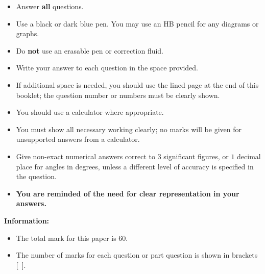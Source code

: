 \documentclass[11pt]{article}
\begin{document}
{\large
	
	\begin{itemize}
		
		\item Answer {\bf all} questions.
		
		\item Use a black or dark blue pen. You may use an HB pencil for
		any diagrams or graphs.
		
		\item Do {\bf not} use an erasable pen or correction fluid.
		
		\item Write your answer to each question in the space provided.
		
		\item If additional space is needed, you should use the lined page
		at the end of this booklet; the question number or numbers must be
		clearly shown.
		
		\item You should use a calculator where appropriate.
		
		\item You must show all necessary working clearly; no marks will
		be given for unsupported answers from a calculator.
		
		\item Give non-exact numerical answers correct to $3$ significant
		figures, or $1$ decimal place for angles in degrees, unless a
		different level of accuracy is specified in the question.
		
		\item {\bf You are reminded of the need for clear representation
			in your answers.}
	\end{itemize}
	
}
\vfill 
\medskip
{\LARGE\bf Information:} 

\begin{itemize}
	
	\item The total mark for this paper is $60$. 
	
	\item The number of marks for each question or part question is
	shown in brackets [\ ].
	
\end{itemize}




 
\end{document}
